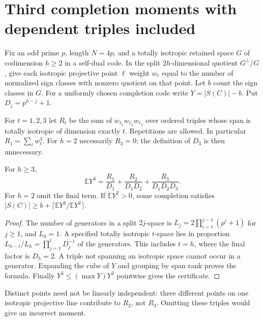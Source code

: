 \section{Third completion moments with dependent triples included}
Fix an odd prime $p$, length $N=4p$, and a totally isotropic retained
space $G$ of codimension $h\ge2$ in a self-dual code. In the split
$2h$-dimensional quotient $G^\perp/G$, give each isotropic projective
point $\ell$ weight $w_\ell$ equal to the number of normalized sign
classes with nonzero quotient on that point. Let $b$ count the sign
classes in $G$. For a uniformly chosen completion code write
$Y=|S(C)|-b$. Put $D_j=p^{h-j}+1$.

For $t=1,2,3$ let $R_t$ be the sum of
$w_{\ell_1}w_{\ell_2}w_{\ell_3}$ over ordered triples whose span is
totally isotropic of dimension exactly $t$. Repetitions are allowed.
In particular $R_1=\sum_\ell w_\ell^3$. For $h=2$ necessarily
$R_3=0$; the definition of $D_3$ is then unnecessary.

\begin{theorem}
For $h\ge3$,
\[
 \mathbb E Y^3=\frac{R_1}{D_1}+
 \frac{R_2}{D_1D_2}+\frac{R_3}{D_1D_2D_3}.
\]
For $h=2$ omit the final term. If $\mathbb EY^2>0$, some completion
satisfies $|S(C)|\ge b+\lceil\mathbb EY^3/\mathbb EY^2\rceil$.
\end{theorem}
\begin{proof}
The number of generators in a split $2j$-space is
$L_j=2\prod_{i=1}^{j-1}(p^i+1)$ for $j\ge1$, and $L_0=1$.
A specified totally isotropic $t$-space lies in proportion
$L_{h-t}/L_h=\prod_{j=1}^tD_j^{-1}$ of the generators.
This includes $t=h$, where the final factor is $D_h=2$.
A triple not spanning an isotropic space cannot occur in a generator.
Expanding the cube of $Y$ and grouping by span rank proves the formula.
Finally $Y^3\le(\max Y)Y^2$ pointwise gives the certificate.
\end{proof}
Distinct points need not be linearly independent: three different
points on one isotropic projective line contribute to $R_2$, not
$R_3$. Omitting these triples would give an incorrect moment.

